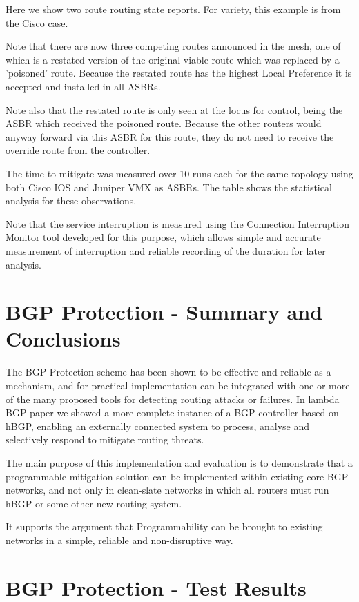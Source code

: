 Here we show two route routing state reports. For variety, this example is from the Cisco case.

Note that there are now three competing routes announced in the mesh, one of which is a restated version of the original viable route which was replaced by a 'poisoned' route. Because the restated route has the highest Local Preference it is accepted and installed in all ASBRs.

Note also that the restated route is only seen at the locus for control, being the ASBR which received the poisoned route. Because the other routers would anyway forward via this ASBR for this route, they do not need to receive the override route from the controller.

The time to mitigate was measured over 10 runs each for the same topology using both Cisco IOS and Juniper VMX as ASBRs. The table shows the statistical analysis for these observations.

Note that the service interruption is measured using the Connection Interruption Monitor tool developed for this purpose, which allows simple and accurate measurement of interruption and reliable recording of the duration for later analysis.

\section{BGP Protection - Summary and Conclusions}

The BGP Protection scheme has been shown to be effective and reliable as a mechanism, and for practical implementation can be integrated with one or more of the many proposed tools for detecting routing attacks or failures. In lambda BGP paper we showed a more complete instance of a BGP controller based on hBGP, enabling an externally connected system to process, analyse and selectively respond to mitigate routing threats.

The main purpose of this implementation and evaluation is to demonstrate that a programmable mitigation solution can be implemented within existing core BGP networks, and not only in clean-slate networks in which all routers must run hBGP or some other new routing system.

It supports the argument that Programmability can be brought to existing networks in a simple, reliable and non-disruptive way.

\section{BGP Protection - Test Results}

